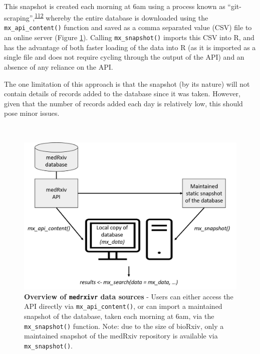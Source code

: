 \documentclass[a4paper, twoside]{templates/ociamthesis}
\begin{document}
~

This snapshot is created each morning at 6am using a process known as ``git-scraping'',\textsuperscript{\protect\hyperlink{ref-zotero-15031}{112}} whereby the entire database is downloaded using the \texttt{mx\_api\_content()} function and saved as a comma separated value (CSV) file to an online server (Figure \ref{fig:medrxivr-data-sources}). Calling \texttt{mx\_snapshot()} imports this CSV into R, and has the advantage of both faster loading of the data into R (as it is imported as a single file and does not require cycling through the output of the API) and an absence of any reliance on the API.

The one limitation of this approach is that the snapshot (by its nature) will not contain details of records added to the database since it was taken. However, given that the number of records added each day is relatively low, this should pose minor issues.

~





\begin{figure}[H]
\includegraphics[width=1\linewidth]{figures/sys-rev-tools/data_sources} \caption[Overview of \texttt{medrxivr} data sources]{\textbf{Overview of \texttt{medrxivr} data sources} - Users can either access the API directly via \texttt{mx\_api\_content()}, or can import a maintained snapshot of the database, taken each morning at 6am, via the \texttt{mx\_snapshot()} function. Note: due to the size of bioRxiv, only a maintained snapshot of the medRxiv repository is available via \texttt{mx\_snapshot()}.}\label{fig:medrxivr-data-sources}
\end{figure}
\end{document}
